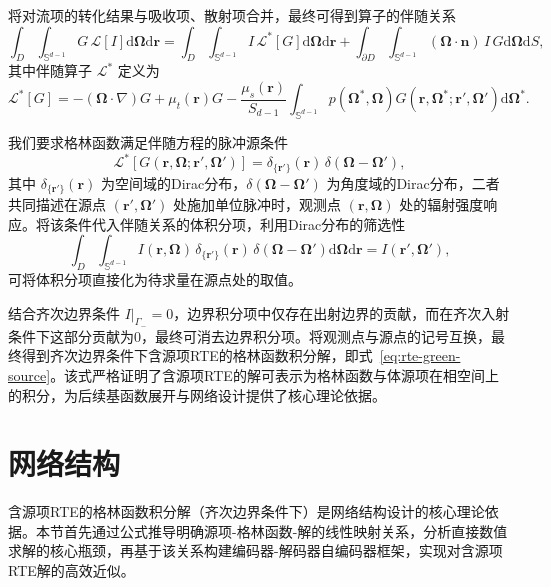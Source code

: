 将对流项的转化结果与吸收项、散射项合并，最终可得到算子的伴随关系
\begin{equation}
    \int_{D}\int_{\mathbb{S}^{d-1}} G\, \mathcal{L}[I] \mathrm{d}\boldsymbol{\Omega}\mathrm{d}\boldsymbol{r}
    = \int_{D}\int_{\mathbb{S}^{d-1}} I\, \mathcal{L}^*[G] \mathrm{d}\boldsymbol{\Omega}\mathrm{d}\boldsymbol{r}
    + \int_{\partial D}\int_{\mathbb{S}^{d-1}} (\boldsymbol{\Omega}\cdot\boldsymbol{n})\, I\, G \mathrm{d}\boldsymbol{\Omega}\mathrm{d} S,
\end{equation}
其中伴随算子 $\mathcal{L}^*$ 定义为
\begin{equation}
    \mathcal{L}^*[G] = - (\boldsymbol{\Omega}\cdot\nabla) G + \mu_t(\boldsymbol{r}) G
    - \frac{\mu_s(\boldsymbol{r})}{S_{d-1}} \int_{\mathbb{S}^{d-1}} p(\boldsymbol{\Omega}^*,\boldsymbol{\Omega}) G(\boldsymbol{r},\boldsymbol{\Omega}^*;\boldsymbol{r}',\boldsymbol{\Omega}')\mathrm{d}\boldsymbol{\Omega}^*.
\end{equation}

我们要求格林函数满足伴随方程的脉冲源条件
\begin{equation}
    \mathcal{L}^*[G(\boldsymbol{r},\boldsymbol{\Omega};\boldsymbol{r}',\boldsymbol{\Omega}')] = \delta_{\{\boldsymbol{r}'\}}(\boldsymbol{r})\,\delta(\boldsymbol{\Omega}-\boldsymbol{\Omega}'),
\end{equation}
其中 $\delta_{\{\boldsymbol{r}'\}}(\boldsymbol{r})$ 为空间域的Dirac分布，$\delta(\boldsymbol{\Omega}-\boldsymbol{\Omega}')$ 为角度域的Dirac分布，二者共同描述在源点 $(\boldsymbol{r}',\boldsymbol{\Omega}')$ 处施加单位脉冲时，观测点 $(\boldsymbol{r},\boldsymbol{\Omega})$ 处的辐射强度响应。将该条件代入伴随关系的体积分项，利用Dirac分布的筛选性
\begin{equation}
    \int_{D}\int_{\mathbb{S}^{d-1}} I(\boldsymbol{r},\boldsymbol{\Omega})\,\delta_{\{\boldsymbol{r}'\}}(\boldsymbol{r})\,\delta(\boldsymbol{\Omega}-\boldsymbol{\Omega}')\mathrm{d}\boldsymbol{\Omega}\mathrm{d}\boldsymbol{r}
    = I(\boldsymbol{r}',\boldsymbol{\Omega}'),
\end{equation}
可将体积分项直接化为待求量在源点处的取值。

结合齐次边界条件 $I|_{\Gamma_-}=0$，边界积分项中仅存在出射边界的贡献，而在齐次入射条件下这部分贡献为0，最终可消去边界积分项。将观测点与源点的记号互换，最终得到齐次边界条件下含源项RTE的格林函数积分解，即式~\eqref{eq:rte-green-source}。该式严格证明了含源项RTE的解可表示为格林函数与体源项在相空间上的积分，为后续基函数展开与网络设计提供了核心理论依据。

\section{网络结构}
含源项RTE的格林函数积分解（齐次边界条件下）是网络结构设计的核心理论依据。本节首先通过公式推导明确源项-格林函数-解的线性映射关系，分析直接数值求解的核心瓶颈，再基于该关系构建编码器-解码器自编码器框架，实现对含源项RTE解的高效近似。

